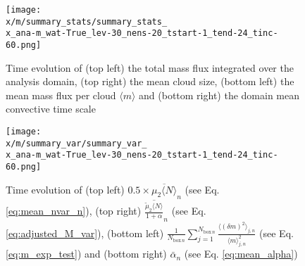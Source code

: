 \documentclass[a4paper, 12pt]{article}
\begin{document}
{%
\begin{figure}[ht] \label{fig:summary_stats}
\noindent \centering
\texttt{[image: \\x/m/summary\_stats/summary\_stats\_\\x\_ana-m\_wat-True\_lev-30\_nens-20\_tstart-1\_tend-24\_tinc-60.png]}\\
\caption{Time evolution of (top left) the total mass flux integrated over the analysis domain, (top right) the mean cloud size, (bottom left) the mean mass flux per cloud $\langle m \rangle$ and (bottom right) the domain mean convective time scale}
\end{figure}

\begin{figure}[ht] \label{fig:summary_var}
\noindent \centering
\texttt{[image: \\x/m/summary\_var/summary\_var\_\\x\_ana-m\_wat-True\_lev-30\_nens-20\_tstart-1\_tend-24\_tinc-60.png]}\\
\caption{Time evolution of (top left) $0.5 \times \overline{\mu_{2}\langle N \rangle}_n$ (see Eq. \ref{eq:mean_nvar_n}), (top right) $\overline{\frac{\tilde{\mu}_2 \langle N \rangle}{1+\alpha}}_n$ (see Eq. \ref{eq:adjusted_M_var}), (bottom left) $\frac{1}{N_{\mathrm{box}\,n}} \sum_{j=1}^{N_{\mathrm{box}\,n}} \frac{\langle (\delta m)^2 \rangle_{j,n}}{\langle m \rangle_{j,n}^2}$ (see Eq. \ref{eq:m_exp_test}) and (bottom right) $\bar{\alpha}_n$ (see Eq. \ref{eq:mean_alpha})}
\end{figure}

\clearpage
}
\end{document}
